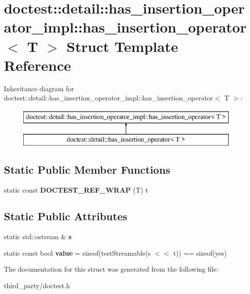 \hypertarget{structdoctest_1_1detail_1_1has__insertion__operator__impl_1_1has__insertion__operator}{}\section{doctest\+::detail\+::has\+\_\+insertion\+\_\+operator\+\_\+impl\+::has\+\_\+insertion\+\_\+operator$<$ T $>$ Struct Template Reference}
\label{structdoctest_1_1detail_1_1has__insertion__operator__impl_1_1has__insertion__operator}
Inheritance diagram for doctest\+::detail\+::has\+\_\+insertion\+\_\+operator\+\_\+impl\+::has\+\_\+insertion\+\_\+operator$<$ T $>$\+:\begin{figure}[H]
\begin{center}
\leavevmode
\includegraphics[height=2.000000cm]{structdoctest_1_1detail_1_1has__insertion__operator__impl_1_1has__insertion__operator}
\end{center}
\end{figure}
\subsection*{Static Public Member Functions}
\begin{DoxyCompactItemize}
\item 
\mbox{\label{structdoctest_1_1detail_1_1has__insertion__operator__impl_1_1has__insertion__operator_a1fb02db021f0e6039e11df088f47ae4f}} 
static const {\bfseries D\+O\+C\+T\+E\+S\+T\+\_\+\+R\+E\+F\+\_\+\+W\+R\+AP} (T) t
\end{DoxyCompactItemize}
\subsection*{Static Public Attributes}
\begin{DoxyCompactItemize}
\item 
\mbox{\label{structdoctest_1_1detail_1_1has__insertion__operator__impl_1_1has__insertion__operator_abdd586daed17058bb6d08adc796802f0}} 
static std\+::ostream \& {\bfseries s}
\item 
\mbox{\label{structdoctest_1_1detail_1_1has__insertion__operator__impl_1_1has__insertion__operator_a8e8e9abdead07386f3d1f16bbca64986}} 
static const bool {\bfseries value} = sizeof(test\+Streamable(s $<$$<$ t)) == sizeof(yes)
\end{DoxyCompactItemize}


The documentation for this struct was generated from the following file\+:\begin{DoxyCompactItemize}
\item 
third\+\_\+party/doctest.\+h\end{DoxyCompactItemize}
